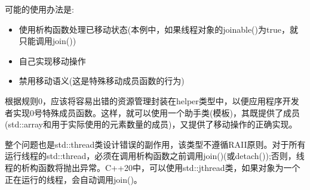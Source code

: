 可能的使用办法是:

\begin{itemize}
	\item 使用析构函数处理已移动状态(本例中，如果线程对象的joinable()为true，就只能调用join())
	\item 自己实现移动操作
	\item 禁用移动语义(这是特殊移动成员函数的行为)
\end{itemize}

根据规则0，应该将容易出错的资源管理封装在helper类型中，以便应用程序开发者实现0号特殊成员函数。这样，就可以使用一个助手类(模板)，其既提供了成员(std::array和用于实际使用的元素数量的成员)，又提供了移动操作的正确实现。

整个问题也是std::thread类设计错误的副作用，该类型不遵循RAII原则。对于所有运行线程的std::thread，必须在调用析构函数之前调用join()(或detach());否则，线程的析构函数将抛出异常。C++20中，可以使用std::jthread类，如果对象为一个正在运行的线程，会自动调用join()。




















